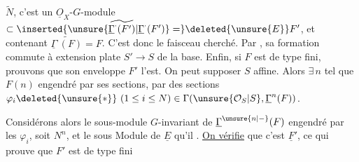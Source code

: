 $\widetilde N$, c'est un $\underline O_X$-$G$-module 
$\subset\inserted{\unsure{\widetilde{\underline{\Gamma}^{\cdot}(F')}|\underline{\Gamma}^{\cdot}(F')}=}\deleted{\unsure{E}}F'$, et contenant $\widetilde{\underline{\Gamma}^{\cdot}(F)}=F$. C'est donc le
 faisceau cherché. Par ,
sa formation commute à  extension
plate $S'\to S$ de la base. Enfin, si
$F$ est de type fini,  prouvons que
son enveloppe $F'$ l'est. On peut supposer $S$
affine. Alors $\exists\,n$ tel que $F(n)$
engendré par ses sections,   par des
sections $\varphi_i\deleted{\unsure{*}}\ (1\leq i\leq N)\in\Gamma(\unsure{\mathcal O_S|S},\underline{\Gamma}^n(F))$.

Considérons alors le sous-module
 $G$-invariant de $\underline{\Gamma}^{\unsure{n|-}}(F)$ engendré
par les $\varphi_i$, soit $N^n$, et le sous
Module de $\underline E$ qu'il . \uline{On
vérifie}  que c'est $\underline F'$, ce qui
prouve que $F'$ est de type fini
